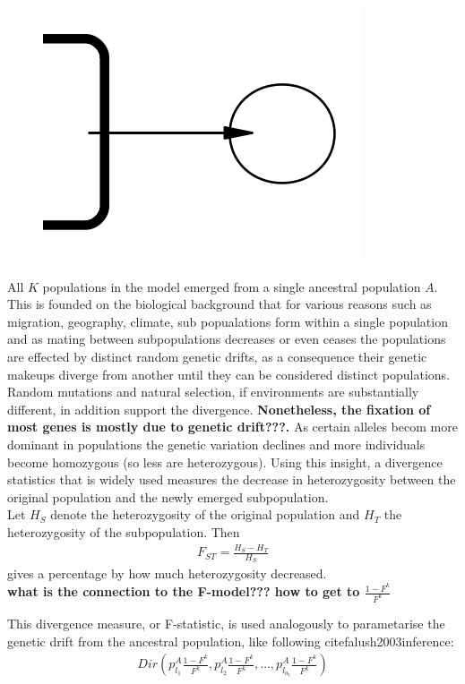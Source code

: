 \documentclass[a4paper, 11pt]{article}
\begin{document}
\begin{figure}
\includegraphics[scale=0.5]{level_1}
\end{figure}

All $K$ populations in the model emerged from a single ancestral population $A$. This is founded on the biological background that for  various reasons such as migration, geography, climate, sub popualations form within a single population and as mating between subpopulations decreases or even ceases the populations are effected by distinct random genetic drifts, as a consequence their genetic makeups diverge from another until they can be considered distinct populations. Random mutations and natural selection, if environments are substantially different, in addition support the divergence. \textbf{Nonetheless, the fixation of most genes is mostly due to genetic drift???.} As certain alleles becom more dominant in populations the genetic variation declines and more individuals become homozygous (so less are heterozygous). Using this insight, a divergence statistics that is widely used measures the decrease in heterozygosity between the original population and the newly emerged subpopulation.\\
Let $H_S$ denote the heterozygosity of the original population and $H_T$ the heterozygosity of the subpopulation. Then
\begin{align*}
F_{ST} = \frac{H_S - H_T}{H_S}
\end{align*}
gives a percentage by how much heterozygosity decreased.\\

\textbf{what is the connection to the F-model??? how to get to $\frac{1-F^k}{F^k}$}

This divergence measure, or F-statistic, is used analogously to parametarise the genetic drift from the ancestral population, like following cite{falush2003inference}:
\begin{align}
Dir(p^A_{l_1} \frac{1 - F^k}{F^k}, p^A_{l_2} \frac{1 - F^k}{F^k}, \ldots , p^A_{l_{a_l}} \frac{1 - F^k}{F^k})
\end{align}
\end{document}
